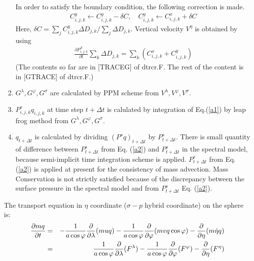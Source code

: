 \begin{enumerate}
  In order to satisfy the boundary condition, the following correction is made. \begin{eqnarray}C^{y}_{i,j,k}\leftarrow C^{y}_{i,j,k}-\delta C, \quad C^{y}_{i,j,k}\leftarrow C^{x}_{i,j,k}+\delta C\end{eqnarray} Here,
  \(\delta C=\sum_{j}C^{y}_{i,j,k}\Delta D_{j,k}/\sum_{j}\Delta D_{j,k}\). Vertical velocity \(V^{\eta}\) is obtained by using \begin{eqnarray}\label{a2}
      \frac{\partial P^{S}_{i,j,k}}{\partial t}\sum_{k}\Delta D_{j,k}=\sum_{k}(C^{x}_{i,j,k}+C^{y}_{i,j,k})\end{eqnarray} (The contents so far are in {[}TRACEG{]} of dtrcr.F. The rest of the content is in
  {[}GTRACE{]} of dtrcr.F.)
\item
  \(G^{\lambda}, G^{\varphi}, G^{\sigma}\) are calculated by PPM scheme from \(V^{\lambda}, V^{\varphi}, V^{\sigma}\).
\item
  \(P^{s}_{i,j,k}q_{i,j,k}\) at time step \(t+\Delta t\) is calulated by integration of Eq.(\ref{a1}) by leap frog method from \(G^{\lambda}, G^{\varphi}, G^{\sigma}\).
\item
  \(q_{t+\Delta t}\) is calculated by dividing \((P^{s}q)_{t+\Delta t}\) by \(P^{s}_{t+\Delta t}\). There is small quantity of difference between \(P^{s}_{t+\Delta t}\) from Eq.
  (\ref{a2}{}) and \(P^{s}_{t+\Delta t}\) in the spectral model, because semi-implicit time integration scheme is applied. \(P^{s}_{t+\Delta t}\) from Eq. (\ref{a2}) is
  applied at present for the consistency of mass advection. Mass Conservation is not strictly satisfied because of the discrepancy between the surface pressure in the spectral model and from
  \(P^{s}_{t+\Delta t}\) Eq. (\ref{a2}).
\end{enumerate}

The transport equation in \(\eta\) coordinate (\(\sigma-p\) hybrid coordinate) on the sphere is: \begin{eqnarray}
\frac{\partial mq}{\partial t} &=& - \frac{1}{a \cos \varphi} \frac{\partial}{\partial \lambda}(muq)- \frac{1}{a \cos \varphi} \frac{\partial}{\partial \varphi}(mvq \cos \varphi)- \frac{\partial}{\partial \eta} (m \dot{\eta} q)\notag\\                                                                         &=& \frac{1}{a \cos \varphi} \frac{\partial}{\partial \lambda}(F^{\lambda})- \frac{1}{a \cos \varphi} \frac{\partial}{\partial \varphi}(F^{\varphi})-\frac{\partial}{\partial \eta} (F^{\eta})\end{eqnarray}


